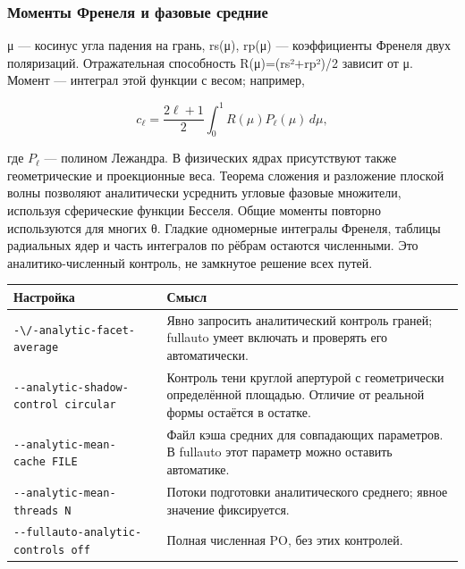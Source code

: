 \subsubsection{Моменты Френеля и фазовые
средние}\label{ux43cux43eux43cux435ux43dux442ux44b-ux444ux440ux435ux43dux435ux43bux44f-ux438-ux444ux430ux437ux43eux432ux44bux435-ux441ux440ux435ux434ux43dux438ux435}

μ --- косинус угла падения на грань, rs(μ), rp(μ) --- коэффициенты
Френеля двух поляризаций. Отражательная способность
R(μ)=(\textbar rs\textbar²+\textbar rp\textbar²)/2 зависит от μ. Момент
--- интеграл этой функции с весом; например,

\[c_\ell=\frac{2\ell+1}{2}\int_0^1 R(\mu)P_\ell(\mu)\,d\mu,\]

где \(P_\ell\) --- полином Лежандра. В физических ядрах присутствуют
также геометрические и проекционные веса. Теорема сложения и разложение
плоской волны позволяют аналитически усреднить угловые фазовые
множители, используя сферические функции Бесселя. Общие моменты повторно
используются для многих θ. Гладкие одномерные интегралы Френеля, таблицы
радиальных ядер и часть интегралов по рёбрам остаются численными. Это
аналитико-численный контроль, не замкнутое решение всех путей.

\begin{longtable}[]{@{}
  >{\raggedright\arraybackslash}p{}
  >{\raggedright\arraybackslash}p{}@{}}
\toprule\noalign{}
\begin{minipage}[b]{\linewidth}\raggedright
Настройка
\end{minipage} & \begin{minipage}[b]{\linewidth}\raggedright
Смысл
\end{minipage} \\
\midrule\noalign{}
\endhead
\bottomrule\noalign{}
\endlastfoot
\nolinkurl{-\/-analytic-facet-average} & Явно запросить аналитический
контроль граней; fullauto умеет включать и проверять его
автоматически. \\
\texttt{-\/-analytic-shadow-control\ circular} & Контроль тени круглой
апертурой с геометрически определённой площадью. Отличие от реальной
формы остаётся в остатке. \\
\texttt{-\/-analytic-mean-cache\ FILE} & Файл кэша средних для
совпадающих параметров. В fullauto этот параметр можно оставить
автоматике. \\
\texttt{-\/-analytic-mean-threads\ N} & Потоки подготовки аналитического
среднего; явное значение фиксируется. \\
\texttt{-\/-fullauto-analytic-controls\ off} & Полная численная PO, без
этих контролей. \\
\end{longtable}

